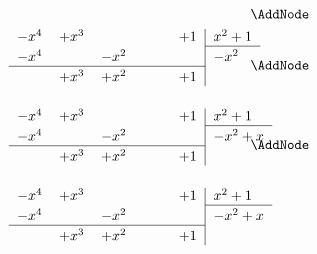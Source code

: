 \begin{esempio}
\begin{NodesList}
\begin{align*}
\begin{minipage}[t]{0.5\textwidth}
\end{minipage}&\AddNode\\
\begin{minipage}[t]{0.5\textwidth}
\begin{tabular}{lllll|l}
$-x^4$& $+x^3$ & \phantom{$-x^2$} & \phantom{$-x$} &$+1$&$ x^2+1$\\ 
\cline{6-6}
  \vrule height 2.5ex width 0pt $-x^4$& &$-x^2$  &  &&$-x^2$\\ 
\cline{1-5}
  \vrule height 2.5ex width 0pt &$+x^3$ & $+x^2$ &  &$+1$&  \\ 
\\
\end{tabular}
\end{minipage}&\AddNode\\
\begin{minipage}[t]{0.5\textwidth}
\begin{tabular}{lllll|l}
$-x^4$& $+x^3$ & \phantom{$-x^2$} & \phantom{$-x$} &$+1$&$ x^2+1$\\ 
\cline{6-6}
  \vrule height 2.5ex width 0pt $-x^4$& &$-x^2$  &  &&$-x^2+x$\\ 
\cline{1-5}
  \vrule height 2.5ex width 0pt &$+x^3$ & $+x^2$ &  &$+1$&  \\ 
\\
\end{tabular}
\end{minipage}&\AddNode\\
\begin{minipage}[t]{0.5\textwidth}
\begin{tabular}{lllll|l}
$-x^4$& $+x^3$ & \phantom{$-x^2$} & \phantom{$-x$} &$+1$&$ x^2+1$\\ 
\cline{6-6}
  \vrule height 2.5ex width 0pt $-x^4$& &$-x^2$  &  &&$-x^2+x$\\ 
\cline{1-5}
  \vrule height 2.5ex width 0pt &$+x^3$ & $+x^2$ &  &$+1$&  \\ 

\end{tabular}
\end{minipage}
\end{align*}
\end{NodesList}
\end{esempio}
